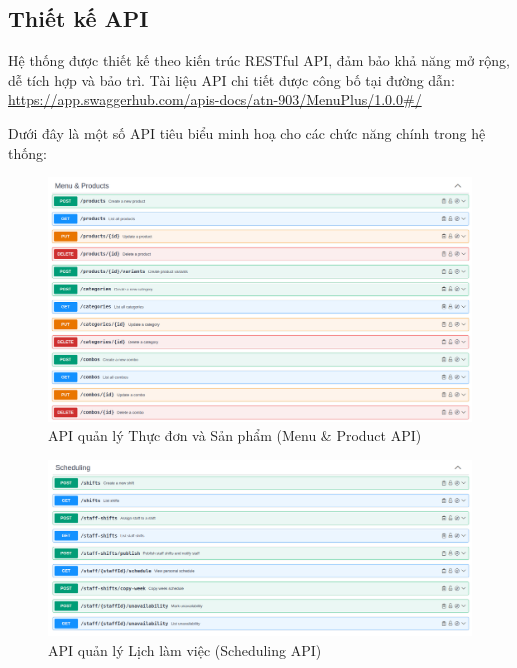 \subsection{Thiết kế API}

Hệ thống được thiết kế theo kiến trúc RESTful API, đảm bảo khả năng mở rộng, dễ tích hợp và bảo trì. Tài liệu API chi tiết được công bố tại đường dẫn:
\url{https://app.swaggerhub.com/apis-docs/atn-903/MenuPlus/1.0.0#/}

Dưới đây là một số API tiêu biểu minh hoạ cho các chức năng chính trong hệ thống:

\begin{figure}[H]
\centering
\includegraphics[width=15cm]{Images/Screenshot from 2025-05-10 17-03-23.png}
\vspace{0.5cm}
\caption{API quản lý Thực đơn và Sản phẩm (Menu & Product API)}
\label{fig:api_menu_product}
\end{figure}

\begin{figure}[H]
\centering
\includegraphics[width=15cm]{Images/Screenshot from 2025-05-10 17-03-40.png}
\vspace{0.5cm}
\caption{API quản lý Lịch làm việc (Scheduling API)}
\label{fig:api_scheduling}
\end{figure}

